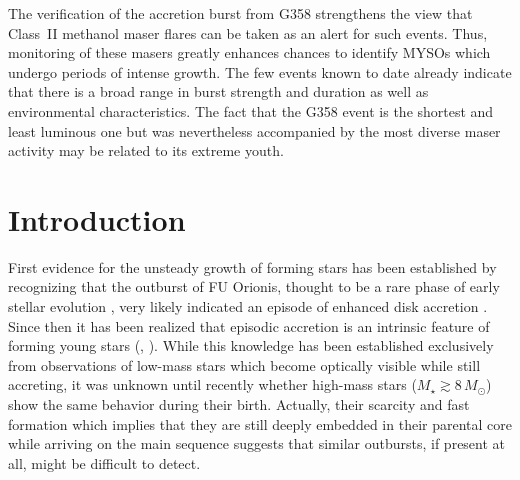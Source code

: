 \documentclass[longauth,usenatbib]{aa}
\begin{document}
   {
   The verification of the accretion burst from G358 strengthens the view that Class~II methanol maser flares can be taken as an alert for such events. Thus, monitoring of these masers greatly enhances chances to identify MYSOs which undergo periods of intense growth. 
   The few events known to date already indicate that there is a broad range in burst strength and duration as well as environmental characteristics. The fact that the G358 event is the shortest and least luminous one but was nevertheless accompanied by the most diverse maser activity may be related to its extreme youth.
   }


   \maketitle
%

\section{Introduction}\label{intro}
First evidence for the unsteady growth of forming stars has been established by recognizing that the outburst of FU Orionis, thought to be a rare phase of early stellar evolution , very likely indicated an episode of enhanced disk accretion . Since then it has been realized that episodic accretion is an intrinsic feature of forming young stars (, ). While this knowledge has been established exclusively from observations of low-mass stars which become optically visible while still accreting, it was unknown until recently whether high-mass stars ($M_{\star}{\gtrsim}8\,M_\odot$) show the same behavior during their birth. Actually, their scarcity and fast formation
which implies that they are still deeply embedded in their parental core while arriving on the main sequence suggests that similar outbursts, if present at all, might be difficult to detect. 
\end{document}
